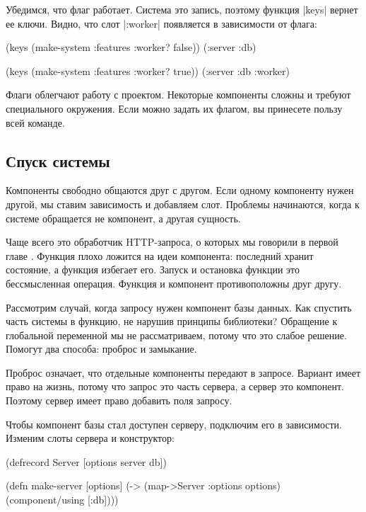 Убедимся, что флаг работает. Система это запись, поэтому функция \spverb|keys|
вернет ее ключи. Видно, что слот \spverb|:worker| появляется в зависимости от
флага:

\begin{english}
  \begin{clojure}
(keys (make-system {:features {:worker? false}}))
(:server :db)

(keys (make-system {:features {:worker? true}}))
(:server :db :worker)
  \end{clojure}
\end{english}

Флаги облегчают работу с проектом. Некоторые компоненты сложны и требуют
специального окружения. Если можно задать их флагом, вы принесете пользу всей
команде.

\subsection{Спуск системы}

Компоненты свободно общаются друг с другом. Если одному компоненту нужен другой,
мы ставим зависимость и добавляем слот. Проблемы начинаются, когда к системе
обращается не компонент, а другая сущность.

Чаще всего это обработчик HTTP-запроса, о которых мы говорили в первой
главе . Функция плохо ложится на идеи компонента: последний
хранит состояние, а функция избегает его. Запуск и остановка функции это
бессмысленная операция. Функция и компонент противоположны друг другу.

Рассмотрим случай, когда запросу нужен компонент базы данных. Как спустить часть
системы в функцию, не нарушив принципы библиотеки? Обращение к глобальной
переменной мы не рассматриваем, потому что это слабое решение. Помогут два
способа: проброс и замыкание.

Проброс означает, что отдельные компоненты передают в запросе. Вариант имеет
право на жизнь, потому что запрос это часть сервера, а сервер это
компонент. Поэтому сервер имеет право добавить поля запросу.

Чтобы компонент базы стал доступен серверу, подключим его в зависимости. Изменим
слоты сервера и конструктор:

\begin{english}
  \begin{clojure}
(defrecord Server
  [options server db])

(defn make-server
  [options]
  (-> (map->Server {:options options})
      (component/using [:db])))
  \end{clojure}
\end{english}

